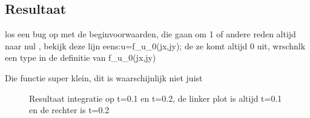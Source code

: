 \documentclass[11pt]{article} %
\begin{document}
	\subsection{Resultaat}
	los een bug op met de beginvoorwaarden, die gaan om 1 of andere reden altijd naar nul , bekijk deze lijn eens:u=f\_u\_0(jx,jy); de ze komt altijd 0 uit, wrschnlk een type in de definitie van f\_u\_0(jx,jy)
	
	Die functie super klein, dit is waarschijnlijk niet juist
	\begin{figure}[H]
		\centering
		\hfill
	
		\caption{Resultaat integratie op t=0.1 en t=0.2, de linker plot is altijd t=0.1 en de rechter is t=0.2}
	\end{figure}
\end{document}
